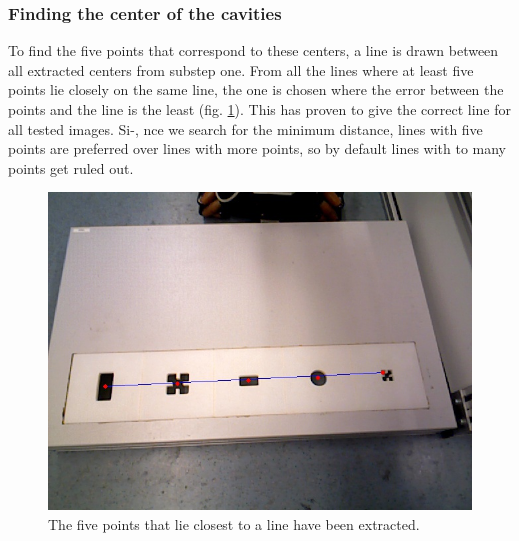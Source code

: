 \documentclass{article}
\begin{document}
\subsubsection*{Finding the center of the cavities}
To find the five points that correspond to these centers, a line is drawn between all extracted centers from substep one. From all the lines where at least five points lie closely on the same line, the one is chosen where the error between the points and the line is the least (fig. \ref{fig:line}). This has proven to give the correct line for all tested images. Si-,
nce we search for the minimum distance, lines with five points are preferred over lines with more points, so by default lines with to many points get ruled out.\\
\begin{figure}[h!]
\centering
\includegraphics[scale=0.3]{images/line.jpg}
\caption{The five points that lie closest to a line have been extracted.}
\label{fig:line}
\end{figure}
\end{document}
